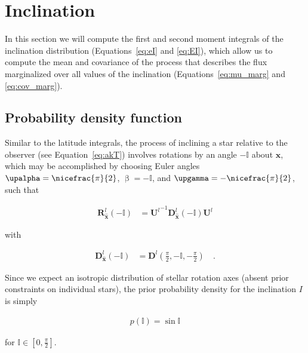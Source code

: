 \documentclass[modern,linenumbers]{aastex62}
\begin{document}
\section{Inclination}
\label{sec:inc}

In this section we will compute the first and second moment integrals of the
inclination distribution (Equations~\ref{eq:eI} and \ref{eq:EI}),
which allow us to compute the mean and covariance of the process
that describes the flux marginalized over all values of the inclination
(Equations~\ref{eq:mu_marg} and \ref{eq:cov_marg}).

\subsection{Probability density function}
%
Similar to the latitude integrals, the process of inclining a star relative to the
observer (see Equation~\ref{eq:akT}) involves
rotations by an angle $-\mathbb{I}$ about $\hat{\mathbf{x}}$, which
may be accomplished by choosing
Euler angles $\upalpha = \nicefrac{\pi}{2}$, $\upbeta = -\mathbb{I}$, and
$\upgamma = -\nicefrac{\pi}{2}$, such that
%
\begin{linenomath}\begin{align}
        \mathbf{R}^l_{\hat{\mathbf{x}}}\left(-\mathbb{I}\right)
         & =
        {\mathbf{U}^l}^{-1} \mathbf{D}^l_{\hat{\mathbf{x}}}\left(-\mathbb{I}\right) \mathbf{U}^l
    \end{align}\end{linenomath}
%
with
\begin{linenomath}\begin{align}
        \mathbf{D}^l_{\hat{\mathbf{x}}}\left(-\mathbb{I}\right)
         & =
        \mathbf{D}^l\left(\frac{\pi}{2}, -\mathbb{I}, -\frac{\pi}{2}\right)
        \quad.
    \end{align}\end{linenomath}
%
Since we expect an isotropic distribution of stellar rotation axes (absent
prior constraints on individual stars), the prior probability density for
the inclination $I$ is simply
%
\begin{linenomath}\begin{align}
        p(\mathbb{I}) = \sin \mathbb{I}
    \end{align}\end{linenomath}
%
for $\mathbb{I} \in [0, \frac{\pi}{2}]$.
\end{document}
